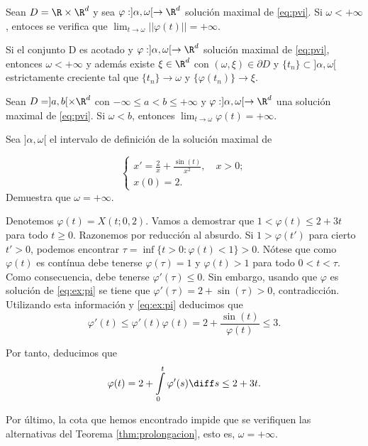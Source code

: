\documentclass{article}
\begin{document}
\begin{corollary}
  Sean $D = \R \times \R^d$ y sea $\varphi: ]\alpha, \omega[ \to \R^d$ solución maximal de
  \eqref{eq:pvi}.  Si $\omega < +\infty$, entoces se verifica que
  $\lim_{t \to \omega} ||\varphi(t)|| = + \infty$.
\end{corollary}

\begin{corollary}
  Si el conjunto D es acotado y $\varphi: ]\alpha, \omega[ \to \R^d$ solución maximal de
  \eqref{eq:pvi}, entonces $\omega < +\infty$ y además existe $\xi \in \R^d$ con
  $(\omega, \xi) \in \partial D$ y $\{t_n\} \subset ]\alpha, \omega[$ estrictamente creciente tal
  que $\{t_n\} \to \omega$ y $\{\varphi(t_n)\} \to \xi$.
\end{corollary}


\begin{corollary} \label{cor:ab:lim} Sean $D = ]a,b[ \times \R^d$ con
  $-\infty \le a < b \le +\infty$ y $\varphi: ]\alpha, \omega[ \to \R^d$ una solución maximal de
  \eqref{eq:pvi}. Si $\omega < b$, entonces $\lim_{t \to \omega} \varphi(t) = +\infty$.
\end{corollary}

\begin{ex}
  Sea $]\alpha, \omega[$ el intervalo de definición de la solución maximal de
  
  \begin{equation}
    \label{eq:ex:pi}
    \begin{cases}
      x' = \frac{2}{x} + \frac{\sin(t)}{x^2}, \quad x > 0; \\
      x(0) = 2.
    \end{cases}
  \end{equation}
  Demuestra que $\omega = +\infty$.

  Denotemos $\varphi(t) = X(t; 0,2)$. Vamos a demostrar que $1 < \varphi(t) \le 2+3t$ para todo
  $t \ge 0$. Razonemos por reducción al absurdo. Si $1 > \varphi(t')$ para cierto $t' > 0$, podemos
  encontrar $\tau = \inf \{t > 0: \varphi(t) < 1\} > 0$. Nótese que como $\varphi(t)$ es contínua
  debe tenerse $\varphi(\tau) = 1$ y $\varphi(t) > 1$ para todo $0 < t < \tau$. Como consecuencia,
  debe tenerse $\varphi'(\tau) \le 0$. Sin embargo, usando que $\varphi$ es solución de
  \eqref{eq:ex:pi} se tiene que $\varphi'(\tau) = 2 + \sin(\tau) > 0$, contradicción. Utilizando
  esta información y \eqref{eq:ex:pi} deducimos que
  \[\varphi'(t) \le \varphi'(t) \varphi(t) = 2 + \frac{\sin(t)}{\varphi(t)} \le 3.\]

  Por tanto, deducimos que
  \[ \varphi(t) = 2 + \int\limits_{0}^{t} \varphi'(s) \diff s \le 2 +3t.\]

  Por último, la cota que hemos encontrado impide que se verifiquen las alternativas del Teorema
  \ref{thm:prolongacion}, esto es, $\omega = +\infty$.
\end{ex}
\end{document}
